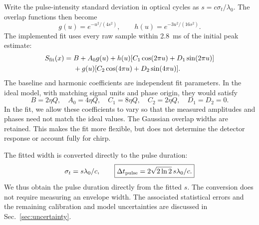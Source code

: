 Write the pulse-intensity standard deviation in optical cycles as $s=c\sigma_t/\lambda_0$. The overlap functions then become
\begin{equation}
g(u)=e^{-u^2/(4s^2)},\qquad
h(u)=e^{-3u^2/(16s^2)}.
\end{equation}
The implemented fit uses every raw sample within \SI{2.8}{ms} of the initial peak estimate:
\begin{equation}\label{eq:fitted-iac}
\begin{aligned}
S_{\rm fit}(x)={}&B+A_0g(u)
+h(u)[C_1\cos(2\pi u)+D_1\sin(2\pi u)]\\
&+g(u)[C_2\cos(4\pi u)+D_2\sin(4\pi u)].
\end{aligned}
\end{equation}
The baseline and harmonic coefficients are independent fit parameters. In the ideal model, with matching signal units and phase origin, they would satisfy
\begin{equation}
B=2\eta Q,\quad A_0=4\eta Q,\quad C_1=8\eta Q,\quad
C_2=2\eta Q,\quad D_1=D_2=0.
\end{equation}
In the fit, we allow these coefficients to vary so that the measured amplitudes and phases need not match the ideal values. The Gaussian overlap widths are retained. This makes the fit more flexible, but does not determine the detector response or account fully for chirp.

The fitted width is converted directly to the pulse duration:
\begin{equation}
\sigma_t=s\lambda_0/c,\qquad
\boxed{\Delta t_{\rm pulse}=2\sqrt{2\ln2}\,s\lambda_0/c.}
\end{equation}
We thus obtain the pulse duration directly from the fitted $s$. The conversion does not require measuring an envelope width. The associated statistical errors and the remaining calibration and model uncertainties are discussed in Sec.~\ref{sec:uncertainty}.
